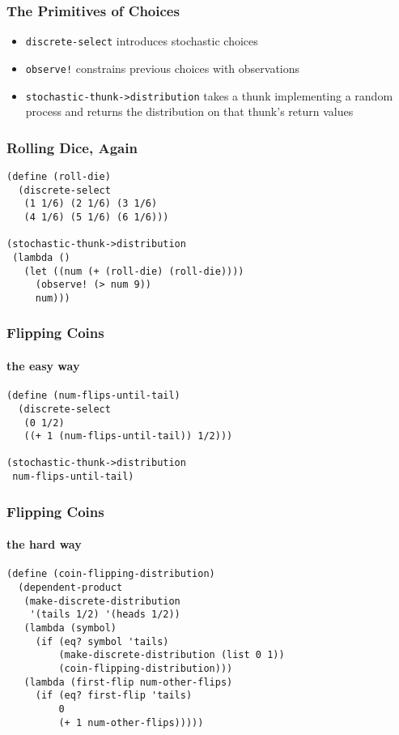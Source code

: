 \documentclass{beamer}
\newcommand{\code}[1]{\texttt{#1}}
\begin{document}
\begin{frame}
  \frametitle{The Primitives of Choices}

  \begin{itemize}
  \item \code{discrete-select} introduces stochastic choices
  \item \code{observe!} constrains previous choices with observations
  \item \code{stochastic-thunk->distribution}
  takes a thunk implementing a random process and
  returns the distribution on that thunk's return values
  \end{itemize}

\end{frame}

\begin{frame}[fragile=singleslide]
  \frametitle{Rolling Dice, Again}

\begin{verbatim}
(define (roll-die)
  (discrete-select
   (1 1/6) (2 1/6) (3 1/6)
   (4 1/6) (5 1/6) (6 1/6)))

(stochastic-thunk->distribution
 (lambda ()
   (let ((num (+ (roll-die) (roll-die))))
     (observe! (> num 9))
     num)))
\end{verbatim}
\end{frame}

\begin{frame}[fragile=singleslide]
  \frametitle{Flipping Coins}
  \framesubtitle{the easy way}

\begin{verbatim}
(define (num-flips-until-tail)
  (discrete-select
   (0 1/2)
   ((+ 1 (num-flips-until-tail)) 1/2)))

(stochastic-thunk->distribution
 num-flips-until-tail)
\end{verbatim}
\end{frame}

\begin{frame}[fragile=singleslide]
  \frametitle{Flipping Coins}
  \framesubtitle{the hard way}

\begin{verbatim}
(define (coin-flipping-distribution)
  (dependent-product
   (make-discrete-distribution
    '(tails 1/2) '(heads 1/2))
   (lambda (symbol)
     (if (eq? symbol 'tails)
         (make-discrete-distribution (list 0 1))
         (coin-flipping-distribution)))
   (lambda (first-flip num-other-flips)
     (if (eq? first-flip 'tails)
         0
         (+ 1 num-other-flips)))))
\end{verbatim}
\end{frame}
\end{document}
